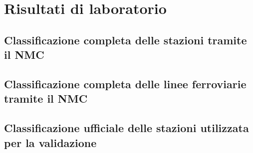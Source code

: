 
\chapter{Risultati di laboratorio}
\label{risultati}
\section{Classificazione completa delle stazioni tramite il NMC}
\label{risultaticompleti}
\section{Classificazione completa delle linee ferroviarie tramite il NMC}

\section{Classificazione ufficiale delle stazioni utilizzata per la validazione }
\label{risultatiUfficiali}

